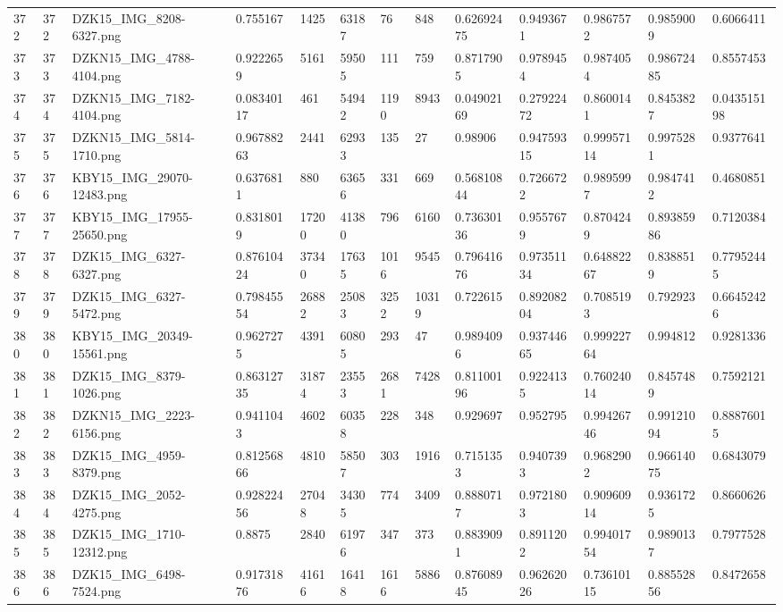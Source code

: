 \documentclass[11pt, a4paper, twoside]{report}
\begin{document}
\begin{longtable}[c]{@{}lllllllllllll@{}}
372 & 372 & DZK15\_IMG\_8208-6327.png & 0.755167 & 1425 & 63187 & 76 & 848 & 0.62692475 & 0.9493671 & 0.9867572 & 0.9859009 & 0.6066411 \\
373 & 373 & DZKN15\_IMG\_4788-4104.png & 0.9222659 & 5161 & 59505 & 111 & 759 & 0.8717905 & 0.9789454 & 0.9874054 & 0.98672485 & 0.8557453 \\
374 & 374 & DZKN15\_IMG\_7182-4104.png & 0.08340117 & 461 & 54942 & 1190 & 8943 & 0.04902169 & 0.27922472 & 0.8600141 & 0.8453827 & 0.043515198 \\
375 & 375 & DZKN15\_IMG\_5814-1710.png & 0.96788263 & 2441 & 62933 & 135 & 27 & 0.98906 & 0.94759315 & 0.99957114 & 0.9975281 & 0.9377641 \\
376 & 376 & KBY15\_IMG\_29070-12483.png & 0.6376811 & 880 & 63656 & 331 & 669 & 0.56810844 & 0.7266722 & 0.9895997 & 0.9847412 & 0.4680851 \\
377 & 377 & KBY15\_IMG\_17955-25650.png & 0.8318019 & 17200 & 41380 & 796 & 6160 & 0.73630136 & 0.9557679 & 0.8704249 & 0.89385986 & 0.7120384 \\
378 & 378 & DZK15\_IMG\_6327-6327.png & 0.87610424 & 37340 & 17635 & 1016 & 9545 & 0.79641676 & 0.97351134 & 0.64882267 & 0.8388519 & 0.77952445 \\
379 & 379 & DZK15\_IMG\_6327-5472.png & 0.79845554 & 26882 & 25083 & 3252 & 10319 & 0.722615 & 0.89208204 & 0.7085193 & 0.792923 & 0.66452426 \\
380 & 380 & KBY15\_IMG\_20349-15561.png & 0.9627275 & 4391 & 60805 & 293 & 47 & 0.9894096 & 0.93744665 & 0.99922764 & 0.994812 & 0.9281336 \\
381 & 381 & DZK15\_IMG\_8379-1026.png & 0.86312735 & 31874 & 23553 & 2681 & 7428 & 0.81100196 & 0.9224135 & 0.76024014 & 0.8457489 & 0.7592121 \\
382 & 382 & DZKN15\_IMG\_2223-6156.png & 0.9411043 & 4602 & 60358 & 228 & 348 & 0.929697 & 0.952795 & 0.99426746 & 0.99121094 & 0.88876015 \\
383 & 383 & DZK15\_IMG\_4959-8379.png & 0.81256866 & 4810 & 58507 & 303 & 1916 & 0.7151353 & 0.9407393 & 0.9682902 & 0.96614075 & 0.6843079 \\
384 & 384 & DZK15\_IMG\_2052-4275.png & 0.92822456 & 27048 & 34305 & 774 & 3409 & 0.8880717 & 0.9721803 & 0.90960914 & 0.9361725 & 0.8660626 \\
385 & 385 & DZK15\_IMG\_1710-12312.png & 0.8875 & 2840 & 61976 & 347 & 373 & 0.8839091 & 0.8911202 & 0.99401754 & 0.9890137 & 0.7977528 \\
386 & 386 & DZK15\_IMG\_6498-7524.png & 0.91731876 & 41616 & 16418 & 1616 & 5886 & 0.87608945 & 0.96262026 & 0.73610115 & 0.88552856 & 0.8472658 \\

\end{longtable}
\end{document}
